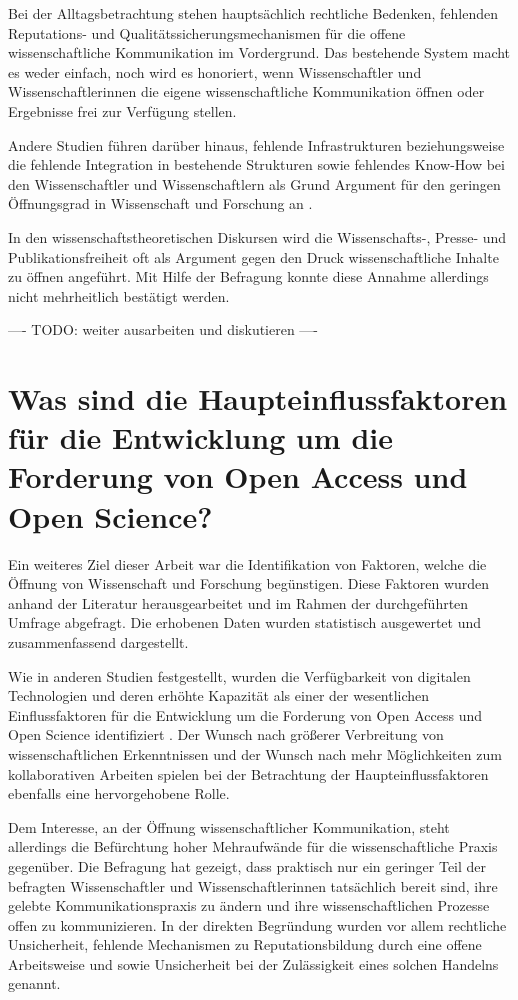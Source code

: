 Bei der Alltagsbetrachtung stehen hauptsächlich rechtliche Bedenken, fehlenden Reputations- und Qualitätssicherungsmechanismen für die offene wissenschaftliche Kommunikation im Vordergrund. Das bestehende System macht es weder einfach, noch wird es honoriert, wenn Wissenschaftler und Wissenschaftlerinnen die eigene wissenschaftliche Kommunikation öffnen oder Ergebnisse frei zur Verfügung stellen.

Andere Studien führen darüber hinaus, fehlende Infrastrukturen beziehungsweise die fehlende Integration in bestehende Strukturen sowie fehlendes Know-How bei den Wissenschaftler und Wissenschaftlern als Grund Argument für den geringen Öffnungsgrad in Wissenschaft und Forschung an \cite{eu_open_science_2015}.

In den wissenschaftstheoretischen Diskursen wird die Wissenschafts-, Presse- und Publikationsfreiheit oft als Argument gegen den Druck wissenschaftliche Inhalte zu öffnen angeführt. Mit Hilfe der Befragung konnte diese Annahme allerdings nicht mehrheitlich bestätigt werden.

---- TODO: weiter ausarbeiten und diskutieren ----

\section{Was sind die Haupteinflussfaktoren für die Entwicklung um die Forderung von Open Access und Open Science?}

Ein weiteres Ziel dieser Arbeit war die Identifikation von Faktoren, welche die Öffnung von Wissenschaft und Forschung begünstigen. Diese Faktoren wurden anhand der Literatur herausgearbeitet und im Rahmen der durchgeführten Umfrage abgefragt. Die erhobenen Daten wurden statistisch ausgewertet und zusammenfassend dargestellt.

Wie in anderen Studien festgestellt, wurden die Verfügbarkeit von digitalen Technologien und deren erhöhte Kapazität als einer der wesentlichen Einflussfaktoren für die Entwicklung um die Forderung von Open Access und Open Science identifiziert \cite{eu_open_science_2015}. Der Wunsch nach größerer Verbreitung von wissenschaftlichen Erkenntnissen und der Wunsch nach mehr Möglichkeiten zum kollaborativen Arbeiten spielen bei der Betrachtung der Haupteinflussfaktoren ebenfalls eine hervorgehobene Rolle.

Dem Interesse, an der Öffnung wissenschaftlicher Kommunikation, steht allerdings die Befürchtung hoher Mehraufwände für die wissenschaftliche Praxis gegenüber. Die Befragung hat gezeigt, dass praktisch nur ein geringer Teil der befragten Wissenschaftler und Wissenschaftlerinnen tatsächlich bereit sind, ihre gelebte Kommunikationspraxis zu ändern und ihre wissenschaftlichen Prozesse offen zu kommunizieren. In der direkten Begründung wurden vor allem rechtliche Unsicherheit, fehlende Mechanismen zu Reputationsbildung durch eine offene Arbeitsweise und sowie Unsicherheit bei der Zulässigkeit eines solchen Handelns genannt.

